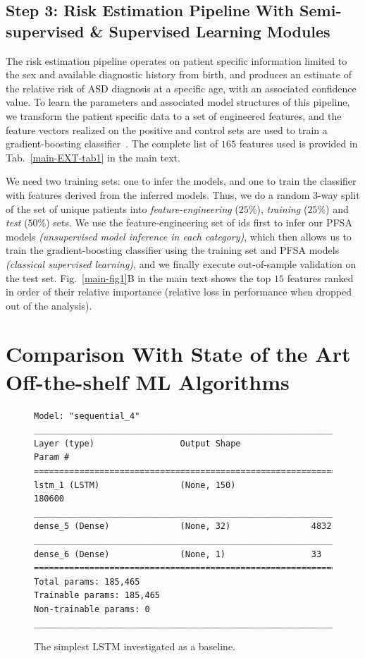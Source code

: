 \documentclass[onecolumn,,10pt]{IEEEtran}
\renewcommand{\captionN}[1]{\caption{\color{CadetBlue4!80!black} \sffamily \fontsize{9}{10}\selectfont #1  }}
\gdef\treatment{positive\xspace}
\begin{document}
\subsection{Step 3: Risk Estimation Pipeline With Semi-supervised \& Supervised Learning Modules}
The risk estimation pipeline operates on patient specific information limited to the sex and available  diagnostic history from birth, and produces an estimate of the relative risk of ASD diagnosis at a specific age, with an associated  confidence value. To learn the parameters and associated model structures of  this pipeline, we transform the patient specific data to a set of engineered features, and the feature vectors realized on the
\treatment and control sets are  used to train a gradient-boosting classifier~\cite{friedman}. The complete list of $165$ features used  is provided in Tab.~\ref{main-EXT-tab1} in the main text.

We need two training sets: one to infer the models, and one to  train the classifier  with features  derived  from the inferred models. Thus, we do a random 3-way split of the set of unique patients into \textit{feature-engineering} ($25\%$), \textit{training} ($25\%$) and \textit{test} ($50\%$) sets. We use the feature-engineering set of ids first to infer our PFSA models \textit{(unsupervised model inference in each category)}, which then allows us to train the gradient-boosting classifier using the training set and PFSA models \textit{(classical supervised learning)}, and we finally execute  out-of-sample validation on the test set. Fig.~\ref{main-fig1}B in the main text shows the top $15$ features  ranked in order of their relative importance (relative loss in performance when dropped out of the analysis). 
\section{Comparison With State of the Art Off-the-shelf ML Algorithms}\label{sec:offtheshelf}
  \begin{figure}[!ht]
    \begin{verbatim}
Model: "sequential_4"
_________________________________________________________________
Layer (type)                 Output Shape              Param #   
=================================================================
lstm_1 (LSTM)                (None, 150)               180600    
_________________________________________________________________
dense_5 (Dense)              (None, 32)                4832      
_________________________________________________________________
dense_6 (Dense)              (None, 1)                 33        
=================================================================
Total params: 185,465
Trainable params: 185,465
Non-trainable params: 0
_________________________________________________________________
\end{verbatim}
    \captionN{The simplest LSTM investigated as a baseline.}\label{figlstmex}
\end{figure}
\end{document}

